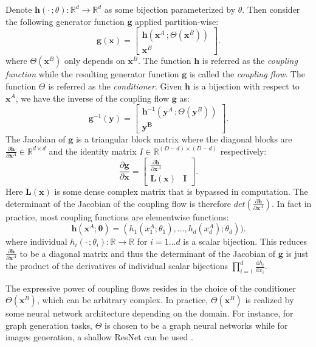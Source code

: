 Denote $\mathbf{h}(\mathbf{\cdot}\,; \theta): \mathbb{R}^d \to \mathbb{R}^d$
as some bijection parameterized by $\theta$. Then consider the following
generator function $\mathbf{g}$ applied partition-wise:
$$
\mathbf{g}(\mathbf{x}) =
\begin{bmatrix}
  \mathbf{h}(\mathbf{x}^A\,; \Theta(\mathbf{x}^B)) \\
  \mathbf{x}^B
\end{bmatrix}
.$$
where $\Theta(\mathbf{x}^B)$ only depends on $\mathbf{x}^B$. The function
$\mathbf{h}$ is referred as the \textit{coupling function} while the resulting
generator function $\mathbf{g}$ is called the \textit{coupling flow}. The
function $\Theta$ is referred as the \textit{conditioner}. Given
$\mathbf{h}$ is a bijection with respect to $\mathbf{x}^A$, we have the inverse
of the coupling flow $\mathbf{g}$ as:
$$
\mathbf{g}^{-1}(\mathbf{y}) =
\begin{bmatrix}
  \mathbf{h}^{-1}(\mathbf{y}^A\,; \Theta(\mathbf{y}^B)) \\
  \mathbf{\mathbf{y}^B}
\end{bmatrix}
.$$
The Jacobian of $\mathbf{g}$ is a triangular block matrix where the
diagonal blocks are $\frac{\partial \mathbf{h}}{\partial \mathbf{x}^A } \in
\mathbb{R}^{d \times d}$ and the
identity matrix $I \in \mathbb{R}^{(D-d) \times (D-d)}$ respectively:
$$
  \frac{\partial \mathbf{g}}{\partial \mathbf{x} } = \begin{bmatrix}
    \frac{\partial \mathbf{h}}{\partial \mathbf{x}^A } & \\
    \mathbf{L}(\mathbf{x}) & \mathbf{I}
  \end{bmatrix}
.$$
Here $\mathbf{L}(\mathbf{x})$ is some dense complex matrix that is bypassed in
computation. The determinant of the Jacobian of the coupling flow is therefore
$det\left(\frac{\partial \mathbf{h}}{\partial \mathbf{x}^A }\right)$. In fact in practice, most coupling functions are elementwise functions:
$$
\mathbf{h}(\mathbf{x}^A; \mathbf{\theta}) = (h_1(x^A_1; \theta_1), \ldots,
h_d(x^A_d);
\theta_d))
.$$
where individual $h_i(\cdot \,;\theta_i): \mathbb{R} \to \mathbb{R}$ for $i=1
\ldots d$ is a scalar bijection. This reduces $\frac{\partial \mathbf{h}}{\partial
\mathbf{x}^A} $ to be a diagonal matrix and thus the determinant of the Jacobian of
$\mathbf{g}$ is just the product of the derivatives of individual scalar
bijections $\prod_{i=1}^d \frac{\text{d}h_i}{\text{d}x_i}$.

The expressive power of coupling flows resides in the choice of the conditioner
$\Theta(\mathbf{x}^B)$, which can be arbitrary complex. In practice,
$\Theta(\mathbf{x}^B)$ is realized by some neural network architecture depending
on the domain. For
instance, for graph generation tasks, $\Theta$ is chosen to be a graph neural
networks \cite{zangMoFlowInvertibleFlow2020} while for images generation, a
shallow ResNet can be used \cite{kingmaGlowGenerativeFlow2018}.

